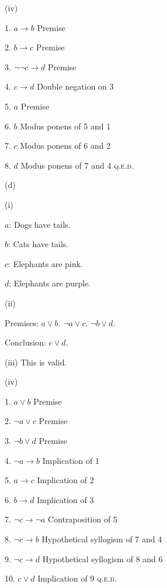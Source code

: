 \documentclass[UTF8,12pt,letterpaper,oneside]{amsart}
\begin{document}
(iv)

1. $a \rightarrow b$ Premise

2. $b \rightarrow c$ Premise

3. $\lnot \lnot c \rightarrow d$ Premise

4. $c \rightarrow d$ Double negation on 3

5. $a$ Premise

6. $b$ Modus ponens of 5 and 1

7. $c$ Modus ponens of 6 and 2

8. $d$ Modus ponens of 7 and 4 \hfill \textsc{q.e.d.}

(d)

(i)

$a$: Dogs have tails.

$b$: Cats have tails.

$c$: Elephants are pink.

$d$: Elephants are purple.

(ii)

Premises: $a \lor b$. $\lnot a \lor c$. $\lnot b \lor d$.

Conclusion: $c \lor d$.

(iii) This is valid.

(iv)

1. $a \lor b$ Premise

2. $\lnot a \lor c$ Premise

3. $\lnot b \lor d$ Premise

4. $\lnot a \rightarrow b$ Implication of 1

5. $a \rightarrow c$ Implication of 2

6. $b \rightarrow d$ Implication of 3

7. $\lnot c \rightarrow \lnot a$ Contraposition of 5

8. $\lnot c \rightarrow b$ Hypothetical syllogism of 7 and 4

9. $\lnot c \rightarrow d$ Hypothetical syllogism of 8 and 6

10. $c \lor d$ Implication of 9 \hfill \textsc{q.e.d.}
\end{document}
